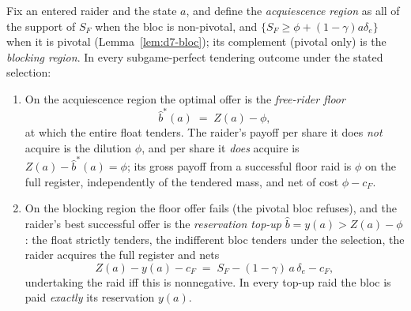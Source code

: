 \begin{lemma}
\label{lem:d7-floor}
Fix an entered raider and the state $a$, and define the \emph{acquiescence region} as all of the support of $S_F$ when the bloc is non-pivotal, and $\{S_{F}\ge\phi+(1-\gamma)a\delta_{e}\}$ when it is pivotal (Lemma~\ref{lem:d7-bloc}); its complement (pivotal only) is the \emph{blocking region}. In every subgame-perfect tendering outcome under the stated selection:
\begin{enumerate}
\item[\textup{(i)}] On the acquiescence region the optimal offer is the \emph{free-rider floor}
\[
\hat b^{\ast}(a)\;=\;Z(a)-\phi ,
\]
at which the entire float tenders. The raider's payoff per share it does \emph{not} acquire is the dilution $\phi$, and per share it \emph{does} acquire is $Z(a)-\hat b^{\ast}(a)=\phi$; its gross payoff from a successful floor raid is $\phi$ on the full register, independently of the tendered mass, and net of cost $\phi-c_{F}$.
\item[\textup{(ii)}] On the blocking region the floor offer fails (the pivotal bloc refuses), and the raider's best successful offer is the \emph{reservation top-up} $\hat b=y(a)>Z(a)-\phi$: the float strictly tenders, the indifferent bloc tenders under the selection, the raider acquires the full register and nets
\[
Z(a)-y(a)-c_{F}\;=\;S_{F}-(1-\gamma)\,a\,\delta_{e}-c_{F},
\]
undertaking the raid iff this is nonnegative. In every top-up raid the bloc is paid \emph{exactly} its reservation $y(a)$.
\end{enumerate}
\end{lemma}

